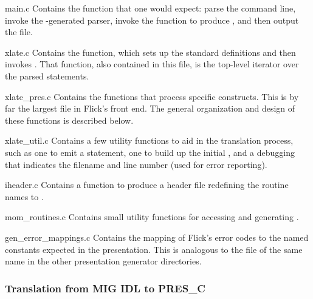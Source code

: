 \begin{filenamelist}
  \item[main.c]
  Contains the  function that one would expect: parse the
  command line, invoke the -generated parser, invoke the
   function to produce \PRESC{}, and then output the
  \PRESC{} file.

  \item[xlate.c]
  Contains the  function, which sets up the standard
  \MINT{} definitions and then invokes .  That
  function, also contained in this file, is the top-level iterator over the
  parsed \MIG{} \IDL{} statements.

  \item[xlate_pres.c]
  Contains the functions that process specific \MIG{} \IDL{} constructs.  This
  is by far the largest file in Flick's \MIG{} front end.  The general
  organization and design of these functions is described below.

  \item[xlate_util.c]
  Contains a few utility functions to aid in the translation process, such as
  one to emit a  statement, one to build up the initial
  \CAST{}, and a debugging  that indicates the filename
  and line number (used for error reporting).

  \item[iheader.c]
  Contains a function to produce a header file redefining the routine names to
  .

  \item[mom_routines.c]
  Contains small utility functions for accessing and generating \MINT{}\@.

  \item[gen_error_mappings.c]
  Contains the mapping of Flick's error codes to the named constants expected
  in the \MIG{} presentation.  This is analogous to the file of the same name
  in the other presentation generator directories.

\end{filenamelist}

\subsubsection{Translation from MIG IDL to PRES\_C}

